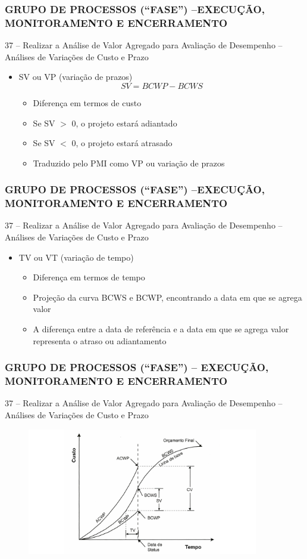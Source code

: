 \begin{frame}
 \frametitle{GRUPO DE PROCESSOS (“FASE”) –\small{EXECUÇÃO, MONITORAMENTO E ENCERRAMENTO}}
37 – Realizar a Análise de Valor Agregado para Avaliação de Desempenho – Análises de Variações de Custo e Prazo
\begin{itemize}
 \item SV ou VP (variação de prazos)
 \begin{equation}
 SV = BCWP - BCWS
 \end{equation}
 \begin{itemize}
  \item Diferença em termos de custo
  \item Se SV $>$ 0, o projeto estará adiantado
  \item Se SV $<$ 0, o projeto estará atrasado
  \item Traduzido pelo PMI como VP ou variação de prazos
 \end{itemize}
 \end{itemize}
\end{frame}

\begin{frame}
 \frametitle{GRUPO DE PROCESSOS (“FASE”) –\small{EXECUÇÃO, MONITORAMENTO E ENCERRAMENTO}}
37 – Realizar a Análise de Valor Agregado para Avaliação de Desempenho – Análises de Variações de Custo e Prazo
\begin{itemize}
 \item TV ou VT (variação de tempo)
 \begin{itemize}
  \item Diferença em termos de tempo
  \item Projeção da curva BCWS e BCWP, encontrando a data em que se agrega valor
  \item A diferença entre a data de referência e a data em que se agrega valor representa o atraso ou adiantamento
 \end{itemize}
 \end{itemize}
\end{frame}

\begin{frame}
 \frametitle{GRUPO DE PROCESSOS (“FASE”) – \small{EXECUÇÃO, MONITORAMENTO E ENCERRAMENTO}}
 37 – Realizar a Análise de Valor Agregado para Avaliação de Desempenho – Análises de Variações de Custo e Prazo
   \begin{figure}
   \centering
   \includegraphics[width = 0.9\textwidth]{figs/fig7.png}
  \end{figure}
\end{frame}

